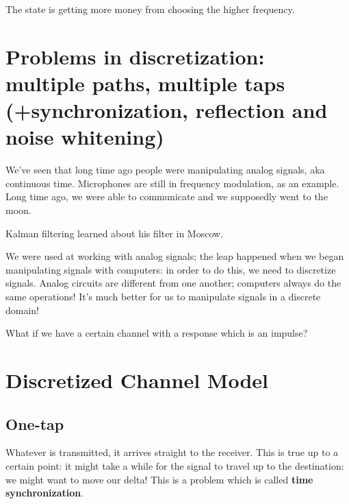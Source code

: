 \documentclass[a4paper, 12pt]{book}
\begin{document}
The state is getting more money from choosing the higher frequency.

\section[Problems in discretization]{Problems in discretization: multiple paths, multiple taps (+synchronization, reflection and noise whitening)}

We've seen that long time ago people were manipulating analog signals, aka continuous time.
Microphones are still in frequency modulation, as an example.
Long time ago, we were able to communicate and we supposedly went to the moon.

Kalman filtering learned about his filter in Moscow.

We were used at working with analog signals; the leap happened when we began manipulating signals with computers: in order to do this, we need to discretize signals.
Analog circuits are different from one another; computers always do the same operations!
It's much better for us to manipulate signals in a discrete domain!

What if we have a certain channel with a response which is an impulse?



\section{Discretized Channel Model}

\subsection*{One-tap}

\begin{center}
\end{center}

Whatever is transmitted, it arrives straight to the receiver.
This is true up to a certain point: it might take a while for the signal to travel up to the destination: we might want to move our delta! This is a problem which is called \textbf{time synchronization}.
\end{document}
